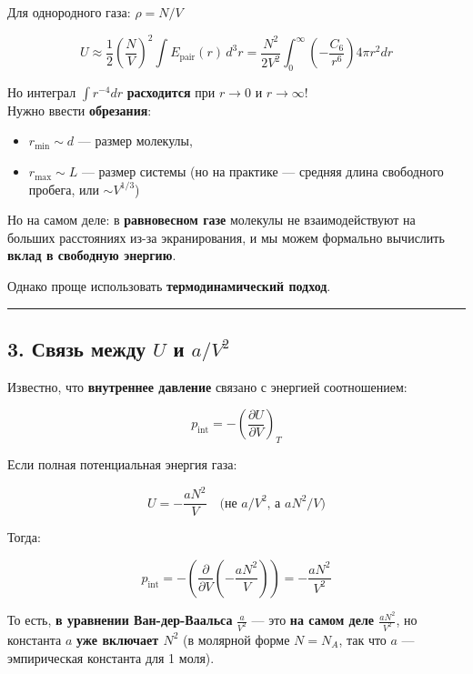 \documentclass[11pt]{article}
\providecommand{\tightlist}{%
      \setlength{\itemsep}{0pt}\setlength{\parskip}{0pt}}
\begin{document}
Для однородного газа: \(\rho = N/V\)

\[
U \approx \frac{1}{2} \left( \frac{N}{V} \right)^2 \int E_{\text{pair}}(r)\, d^3r = \frac{N^2}{2V^2} \int_0^\infty \left( -\frac{C_6}{r^6} \right) 4\pi r^2 dr
\]

Но интеграл \(\int r^{-4} dr\) \textbf{расходится} при \(r \to 0\) и
\(r \to \infty\)!\\
Нужно ввести \textbf{обрезания}:

\begin{itemize}
\tightlist
\item
  \(r_{\text{min}} \sim d\) --- размер молекулы,
\item
  \(r_{\text{max}} \sim L\) --- размер системы (но на практике ---
  средняя длина свободного пробега, или \(\sim V^{1/3}\))
\end{itemize}

Но на самом деле: в \textbf{равновесном газе} молекулы не
взаимодействуют на больших расстояниях из-за экранирования, и мы можем
формально вычислить \textbf{вклад в свободную энергию}.

Однако проще использовать \textbf{термодинамический подход}.

\begin{center}\rule{0.5\linewidth}{\linethickness}\end{center}

\subsection{\texorpdfstring{3. Связь между \(U\) и
\(a/V^2\)}{3. Связь между U и a/V\^{}2}}\label{ux441ux432ux44fux437ux44c-ux43cux435ux436ux434ux443-u-ux438-av2}

Известно, что \textbf{внутреннее давление} связано с энергией
соотношением:

\[
p_{\text{int}} = -\left( \frac{\partial U}{\partial V} \right)_T
\]

Если полная потенциальная энергия газа:

\[
U = -\frac{a N^2}{V}
\quad \text{(не } a/V^2\text{, а } a N^2 / V\text{)}
\]

Тогда:

\[
p_{\text{int}} = -\left( \frac{\partial}{\partial V} \left( -\frac{a N^2}{V} \right) \right) = -\frac{a N^2}{V^2}
\]

То есть, \textbf{в уравнении Ван-дер-Ваальса} \(\frac{a}{V^2}\) --- это
\textbf{на самом деле \(\frac{a N^2}{V^2}\)}, но константа \(a\)
\textbf{уже включает \(N^2\)} (в молярной форме \(N = N_A\), так что
\(a\) --- эмпирическая константа для 1 моля).
\end{document}
